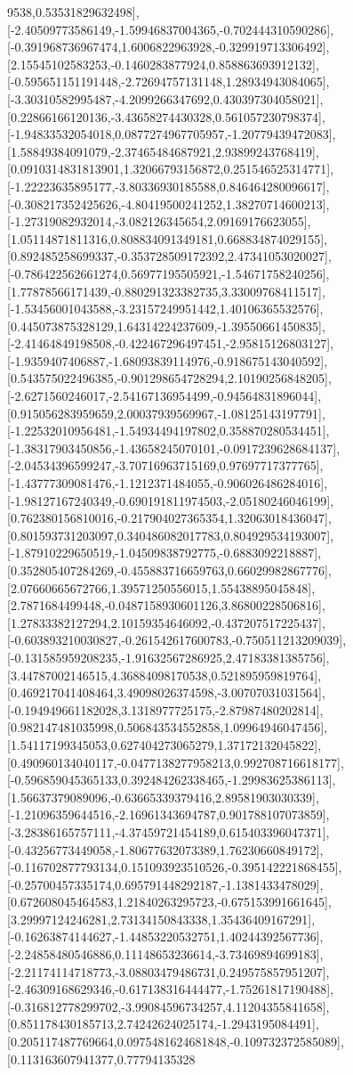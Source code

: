 \documentclass{article}
\begin{document}
9538,0.53531829632498],[-2.40509773586149,-1.59946837004365,-0.702444310590286],[-0.391968736967474,1.6006822963928,-0.329919713306492],[2.15545102583253,-0.1460283877924,0.858863693912132],[-0.595651151191448,-2.72694757131148,1.28934943084065],[-3.30310582995487,-4.2099266347692,0.430397304058021],[0.22866166120136,-3.43658274430328,0.561057230798374],[-1.94833532054018,0.0877274967705957,-1.20779439472083],[1.58849384091079,-2.37465484687921,2.93899243768419],[0.0910314831813901,1.32066793156872,0.251546525314771],[-1.22223635895177,-3.80336930185588,0.846464280096617],[-0.308217352425626,-4.80419500241252,1.38270714600213],[-1.27319082932014,-3.082126345654,2.09169176623055],[1.05114871811316,0.808834091349181,0.668834874029155],[0.892485258699337,-0.353728509172392,2.47341053020027],[-0.786422562661274,0.56977195505921,-1.54671758240256],[1.77878566171439,-0.880291323382735,3.33009768411517],[-1.53456001043588,-3.23157249951442,1.40106365532576],[0.445073875328129,1.64314224237609,-1.39550661450835],[-2.41464849198508,-0.422467296497451,-2.95815126803127],[-1.9359407406887,-1.68093839114976,-0.918675143040592],[0.543575022496385,-0.901298654728294,2.10190256848205],[-2.6271560246017,-2.54167136954499,-0.94564831896044],[0.915056283959659,2.00037939569967,-1.08125143197791],[-1.22532010956481,-1.54934494197802,0.358870280534451],[-1.38317903450856,-1.43658245070101,-0.0917239628684137],[-2.04534396599247,-3.70716963715169,0.97697717377765],[-1.43777309081476,-1.1212371484055,-0.906026486284016],[-1.98127167240349,-0.690191811974503,-2.05180246046199],[0.762380156810016,-0.217904027365354,1.32063018436047],[0.801593731203097,0.340486082017783,0.804929534193007],[-1.87910229650519,-1.04509838792775,-0.6883092218887],[0.352805407284269,-0.455883716659763,0.66029982867776],[2.07660665672766,1.39571250556015,1.55438895045848],[2.7871684499448,-0.0487158930601126,3.86800228506816],[1.27833382127294,2.10159354646092,-0.437207517225437],[-0.603893210030827,-0.261542617600783,-0.750511213209039],[-0.131585959208235,-1.91632567286925,2.47183381385756],[3.44787002146515,4.36884098170538,0.521895959819764],[0.469217041408464,3.49098026374598,-3.00707031031564],[-0.194949661182028,3.1318977725175,-2.87987480202814],[0.982147481035998,0.506843534552858,1.09964946047456],[1.54117199345053,0.627404273065279,1.37172132045822],[0.490960134040117,-0.0477138277958213,0.992708716618177],[-0.596859045365133,0.392484262338465,-1.29983625386113],[1.56637379089096,-0.63665339379416,2.89581903030339],[-1.21096359644516,-2.16961343694787,0.901788107073859],[-3.28386165757111,-4.37459721454189,0.615403396047371],[-0.43256773449058,-1.80677632073389,1.76230660849172],[-0.116702877793134,0.151093923510526,-0.395142221868455],[-0.25700457335174,0.695791448292187,-1.1381433478029],[0.672608045464583,1.21840263295723,-0.675153991661645],[3.29997124246281,2.73134150843338,1.35436409167291],[-0.16263874144627,-1.44853220532751,1.40244392567736],[-2.24858480546886,0.11148653236614,-3.73469894699183],[-2.21174114718773,-3.08803479486731,0.249575857951207],[-2.46309168629346,-0.617138316444477,-1.75261817190488],[-0.316812778299702,-3.99084596734257,4.11204355841658],[0.851178430185713,2.74242624025174,-1.2943195084491],[0.205117487769664,0.0975481624681848,-0.109732372585089],[0.113163607941377,0.77794135328
\end{document}
